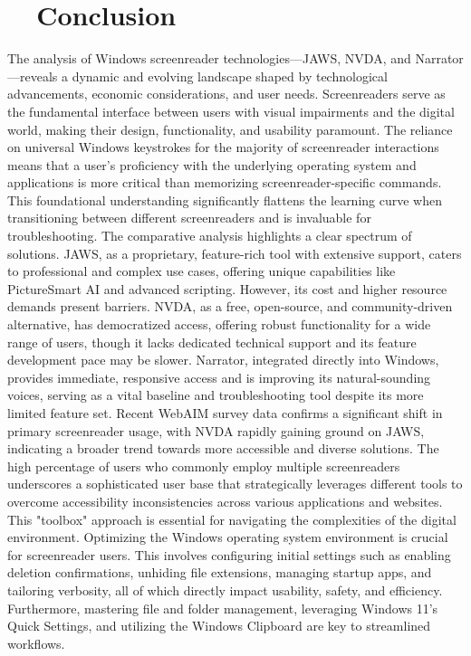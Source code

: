 \section{~~Conclusion}
The analysis of Windows screenreader technologies—JAWS, NVDA, and Narrator—reveals a dynamic and evolving landscape shaped by technological advancements, economic considerations, and user needs. Screenreaders serve as the fundamental interface between users with visual impairments and the digital world, making their design, functionality, and usability paramount.
The reliance on universal Windows keystrokes for the majority of screenreader interactions means that a user's proficiency with the underlying operating system and applications is more critical than memorizing screenreader-specific commands. This foundational understanding significantly flattens the learning curve when transitioning between different screenreaders and is invaluable for troubleshooting.
The comparative analysis highlights a clear spectrum of solutions. JAWS, as a proprietary, feature-rich tool with extensive support, caters to professional and complex use cases, offering unique capabilities like PictureSmart AI and advanced scripting. However, its cost and higher resource demands present barriers. NVDA, as a free, open-source, and community-driven alternative, has democratized access, offering robust functionality for a wide range of users, though it lacks dedicated technical support and its feature development pace may be slower. Narrator, integrated directly into Windows, provides immediate, responsive access and is improving its natural-sounding voices, serving as a vital baseline and troubleshooting tool despite its more limited feature set.
Recent WebAIM survey data confirms a significant shift in primary screenreader usage, with NVDA rapidly gaining ground on JAWS, indicating a broader trend towards more accessible and diverse solutions. The high percentage of users who commonly employ multiple screenreaders underscores a sophisticated user base that strategically leverages different tools to overcome accessibility inconsistencies across various applications and websites. This "toolbox" approach is essential for navigating the complexities of the digital environment.
Optimizing the Windows operating system environment is crucial for screenreader users. This involves configuring initial settings such as enabling deletion confirmations, unhiding file extensions, managing startup apps, and tailoring verbosity, all of which directly impact usability, safety, and efficiency. Furthermore, mastering file and folder management, leveraging Windows 11's Quick Settings, and utilizing the Windows Clipboard are key to streamlined workflows.
